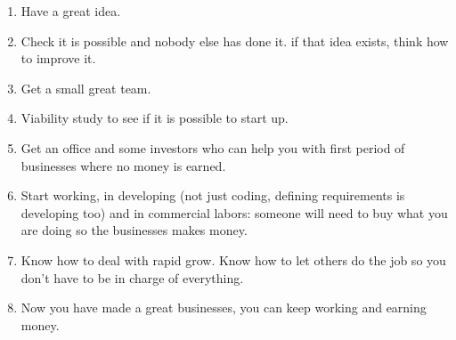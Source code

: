 \documentclass{article}
\begin{document}
\begin{enumerate}
	\item Have a great idea.
	\item Check it is possible and nobody else has done it.
	\subitem if that idea exists, think how to improve it.
	\item Get a small great team.
	\item Viability study to see if it is possible to start up.
	\item Get an office and some investors who can help you with first period of businesses where no money is earned.
	\item Start working, in developing (not just coding, defining requirements is developing too) and in commercial labors: someone will need to buy what you are doing so the businesses makes money.
	\item Know how to deal with rapid grow. Know how to let others do the job so you don't have to be in charge of everything.
	\item Now you have made a great businesses, you can keep working and earning money.
\end{enumerate}
\end{document}
